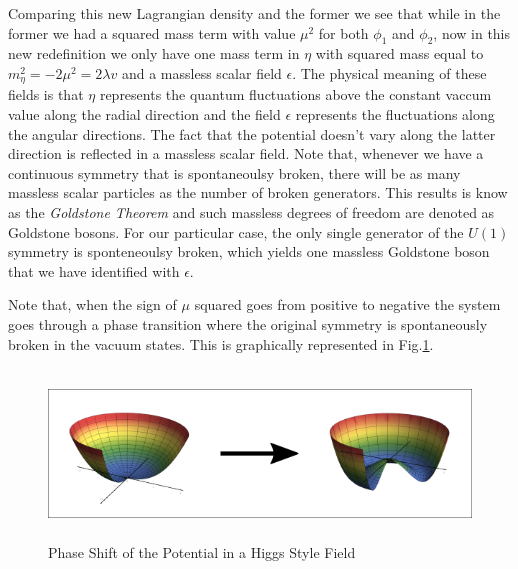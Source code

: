 \documentclass[12pt]{article}
\begin{document}
Comparing this new Lagrangian density and the former we see that while in the former we had a squared mass term with value $\mu^2$ for both $\phi_1$ and $\phi_2$, now in this new redefinition we only have one mass term in $\eta$ with squared mass equal to $ m^2_\eta = - 2 \mu^2 = 2 \lambda v $ and a massless scalar field $\epsilon$.
%
The physical meaning of these fields is that $\eta$ represents the quantum fluctuations above the constant vaccum value along the radial direction and the field $\epsilon$ represents the fluctuations along the angular directions.%
%
The fact that the potential doesn't vary along the latter direction is reflected in a massless scalar field. Note that, whenever we have a continuous symmetry that is spontaneoulsy broken, there will be as many massless scalar particles as the number of broken generators. This results is know as the \textit{Goldstone Theorem} and such massless degrees of freedom are denoted as Goldstone bosons. For our particular case, the only single generator of the $U(1)$ symmetry is sponteneoulsy broken, which yields one massless Goldstone boson that we have identified with $\epsilon$.

Note that, when the sign of $\mu$ squared goes from positive to negative the system goes through a phase transition where the original symmetry is spontaneously broken in the vacuum states. This is graphically represented in Fig.\ref{phase}.


\begin{figure}[H]
\centering
\includegraphics[width=14cm, height=4.5cm]{Des.png}
\caption{Phase Shift of the Potential in a Higgs Style Field}
\label{phase}
\end{figure}
\end{document}
